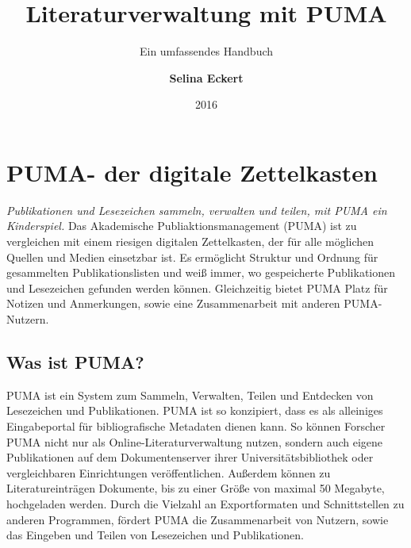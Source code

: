 \documentclass[b5paper,11pt,twoside]{scrbook} %
\begin{document}
    \title{\Huge Literaturverwaltung mit PUMA}
    \subtitle{\Large Ein umfassendes Handbuch}
    \author{\textbf{Selina Eckert}}
    \date{2016}

\maketitle
{} 
\tableofcontents 
\newpage
{} 
\section{PUMA- der digitale Zettelkasten}
\textit{Publikationen und Lesezeichen sammeln, verwalten und teilen, mit PUMA ein Kinderspiel.}\newline
\newline
Das Akademische Publiaktionsmanagement (PUMA) ist zu vergleichen mit einem riesigen digitalen Zettelkasten, der für alle möglichen Quellen und Medien einsetzbar ist. Es ermöglicht Struktur und Ordnung für gesammelten Publikationslisten und weiß immer, wo gespeicherte Publikationen und Lesezeichen gefunden werden können. Gleichzeitig bietet PUMA Platz für Notizen und Anmerkungen, sowie eine Zusammenarbeit mit anderen PUMA-Nutzern. 
\subsection{Was ist PUMA?}
PUMA ist ein System zum Sammeln, Verwalten, Teilen und Entdecken von Lesezeichen und Publikationen. \newline
\newline
PUMA ist so konzipiert, dass es als alleiniges Eingabeportal für bibliografische Metadaten dienen kann. So können Forscher PUMA nicht nur als Online-Literaturverwaltung nutzen, sondern auch eigene Publikationen auf dem Dokumentenserver ihrer Universitätsbibliothek oder vergleichbaren Einrichtungen veröffentlichen. Außerdem können zu Literatureinträgen Dokumente, bis zu einer Größe von maximal 50 Megabyte, hochgeladen werden. \newline
Durch die Vielzahl an Exportformaten und Schnittstellen zu anderen Programmen, fördert PUMA  die Zusammenarbeit von Nutzern, sowie das Eingeben und Teilen von Lesezeichen und Publikationen. 
\end{document}
